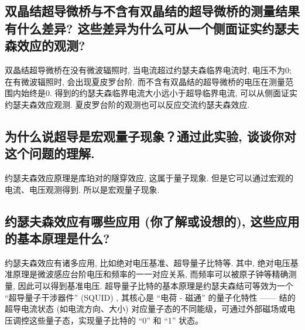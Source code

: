 \documentclass[font=default]{mpltx}
\begin{document}
\subsection{双晶结超导微桥与不含有双晶结的超导微桥的测量结果有什么差异? 这些差异为什么可从一个侧面证实约瑟夫森效应的观测? }
双晶结超导微桥在没有微波辐照时, 当电流超过约瑟夫森临界电流时, 电压不为0; 在有微波辐照时, 会出现夏皮罗台阶. 而不含有双晶结的超导微桥的电压在测量范围内始终是0. 
得到的约瑟夫森临界电流大小远小于超导临界电流, 可以从侧面证实
约瑟夫森效应观测.
夏皮罗台阶的观测也可以反应交流约瑟夫森效应.


\subsection{为什么说超导是宏观量子现象？通过此实验, 谈谈你对这个问题的理解. }
约瑟夫森效应原理是库珀对的隧穿效应, 这属于量子现象. 但是它可以通过宏观的电流、电压观测得到. 所以是宏观量子现象.

\subsection{约瑟夫森效应有哪些应用 (你了解或设想的), 这些应用的基本原理是什么? }
约瑟夫森效应有诸多应用, 比如绝对电压基准、超导量子比特等. 其中, 绝对电压基准原理是微波感应台阶电压和频率的一一对应关系, 而频率可以被原子钟等精确测量, 因此可以得到基准电压.
超导量子比特的基本原理是约瑟夫森结可等效为一个 “超导量子干涉器件” (SQUID) , 其核心是 “电荷 - 磁通” 的量子化特性 —— 结的超导电流状态 (如电流方向、大小) 对应量子态的不同能级，可通过外部磁场或电压调控这些量子态，实现量子比特的 “0” 和 “1” 状态。






\end{document}
